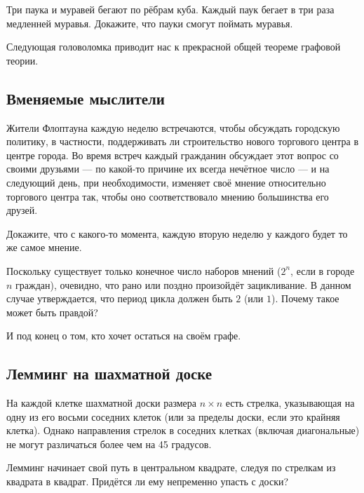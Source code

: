 Три паука и муравей бегают по рёбрам куба.
Каждый паук бегает в три раза медленней муравья.
Докажите, что пауки смогут поймать муравья.

\medskip

Следующая головоломка приводит нас к прекрасной общей теореме графовой теории.

\subsection*{Вменяемые мыслители}

Жители Флоптауна каждую неделю встречаются, чтобы обсуждать городскую политику, в частности, поддерживать ли строительство нового торгового центра в центре города.
Во время встреч каждый гражданин обсуждает этот вопрос со своими друзьями --- по какой-то причине их всегда нечётное число --- и на следующий день, при необходимости, изменяет своё мнение относительно торгового центра так, чтобы оно соответствовало мнению большинства его друзей.

Докажите, что с какого-то момента, каждую вторую неделю у каждого будет то же самое мнение.

Поскольку существует только конечное число наборов мнений ($2^n$, если в городе $n$ граждан), очевидно, что рано или поздно произойдёт зацикливание.
В данном случае утверждается, что период цикла должен быть $2$ (или $1$).
Почему такое может быть правдой?

\medskip

И под конец о том, кто хочет остаться на своём графе.

\subsection*{Лемминг на шахматной доске}

На каждой клетке шахматной доски размера $n\times n$ есть стрелка, указывающая на одну из его восьми соседних клеток (или за пределы доски, если это крайняя клетка).
Однако направления стрелок в соседних клетках (включая диагональные) не могут различаться более чем на 45 градусов.

Лемминг начинает свой путь в центральном квадрате, следуя по стрелкам из квадрата в квадрат.
Придётся ли ему непременно упасть с доски?
